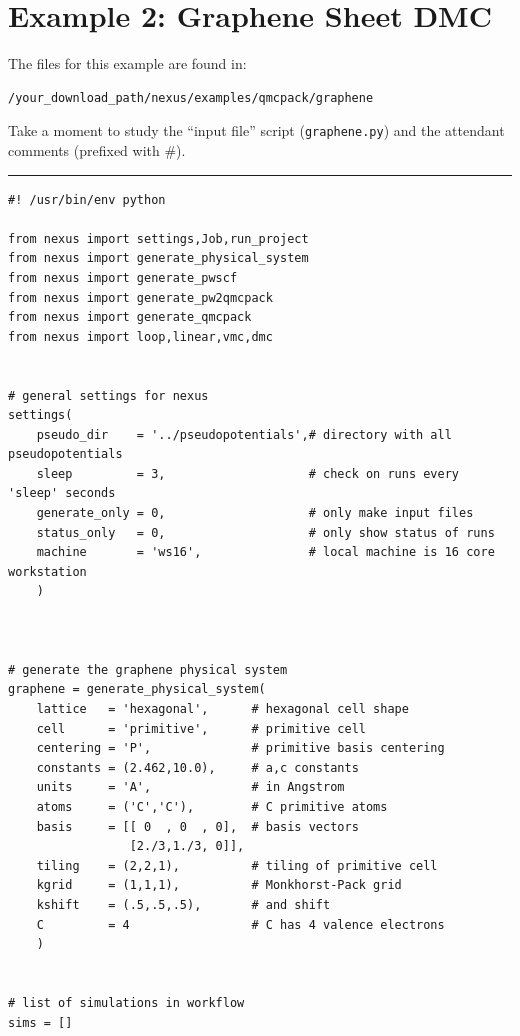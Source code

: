 \documentclass[oneside,11pt]{memoir}
\numberwithin{equation}{section}
\newcommand{\HRule}{\rule{\linewidth}{0.5mm}}
\begin{document}
\pagebreak
\section{Example 2: Graphene Sheet DMC} \label{graphene_dmc}
The files for this example are found in:
\begin{shaded}
\begin{verbatim}
/your_download_path/nexus/examples/qmcpack/graphene
\end{verbatim}
\end{shaded}

Take a moment to study the ``input file'' script 
(\texttt{graphene.py}) and the attendant comments 
(prefixed with \#). 


\HRule
\begin{verbatim}
#! /usr/bin/env python

from nexus import settings,Job,run_project
from nexus import generate_physical_system
from nexus import generate_pwscf
from nexus import generate_pw2qmcpack
from nexus import generate_qmcpack
from nexus import loop,linear,vmc,dmc


# general settings for nexus
settings(
    pseudo_dir    = '../pseudopotentials',# directory with all pseudopotentials
    sleep         = 3,                    # check on runs every 'sleep' seconds
    generate_only = 0,                    # only make input files
    status_only   = 0,                    # only show status of runs
    machine       = 'ws16',               # local machine is 16 core workstation
    )



# generate the graphene physical system
graphene = generate_physical_system(
    lattice   = 'hexagonal',      # hexagonal cell shape
    cell      = 'primitive',      # primitive cell
    centering = 'P',              # primitive basis centering
    constants = (2.462,10.0),     # a,c constants
    units     = 'A',              # in Angstrom
    atoms     = ('C','C'),        # C primitive atoms
    basis     = [[ 0  , 0  , 0],  # basis vectors
                 [2./3,1./3, 0]],
    tiling    = (2,2,1),          # tiling of primitive cell
    kgrid     = (1,1,1),          # Monkhorst-Pack grid
    kshift    = (.5,.5,.5),       # and shift
    C         = 4                 # C has 4 valence electrons
    ) 


# list of simulations in workflow
sims = []


\end{verbatim}
\end{document}
